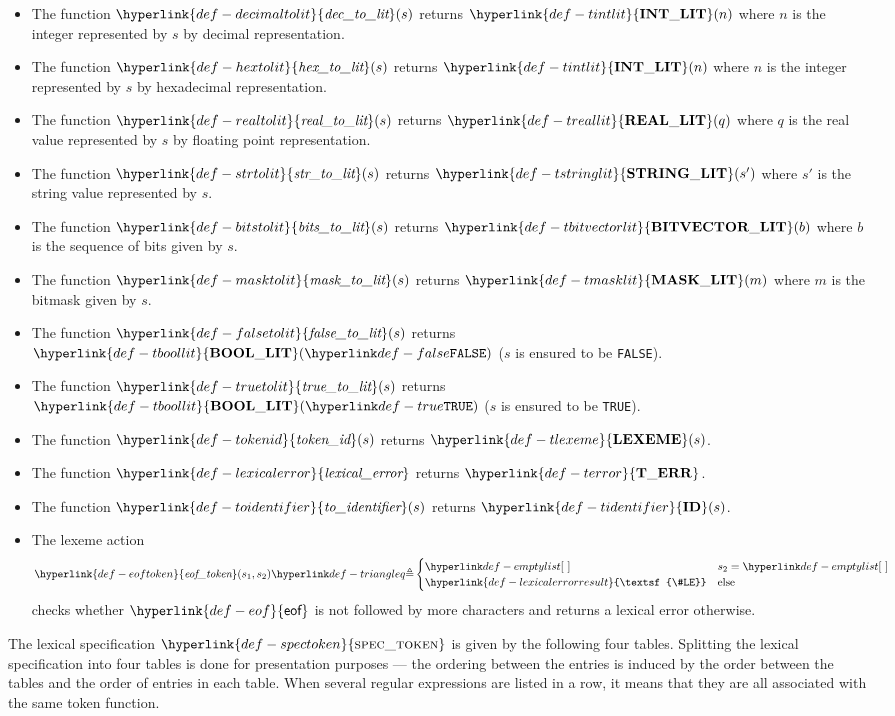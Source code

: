 \documentclass{book}
\newcommand\terminal[1]{\mathtt{\mathbf{#1}}}
\newcommand\Tidentifier[0]{\hyperlink{def-tidentifier}{\terminal{ID}}}
\newcommand\Tstringlit[0]{\hyperlink{def-tstringlit}{\terminal{STRING\_LIT}}}
\newcommand\Tmasklit[0]{\hyperlink{def-tmasklit}{\terminal{MASK\_LIT}}}
\newcommand\Tbitvectorlit[0]{\hyperlink{def-tbitvectorlit}{\terminal{BITVECTOR\_LIT}}}
\newcommand\Tintlit[0]{\hyperlink{def-tintlit}{\terminal{INT\_LIT}}}
\newcommand\Treallit[0]{\hyperlink{def-treallit}{\terminal{REAL\_LIT}}}
\newcommand\Tboollit[0]{\hyperlink{def-tboollit}{\terminal{BOOL\_LIT}}}
\newcommand\Tlexeme[0]{\hyperlink{def-tlexeme}{\terminal{LEXEME}}}
\newcommand\eof[0]{\hyperlink{def-eof}{\textsf{eof}}}
\newcommand\LexicalError[0]{\hyperlink{def-lexicalerrorresult}{\textsf{\#LE}}}
\newcommand\decimaltolit[0]{\hyperlink{def-decimaltolit}{\textfunc{dec\_to\_lit}}}
\newcommand\hextolit[0]{\hyperlink{def-hextolit}{\textfunc{hex\_to\_lit}}}
\newcommand\realtolit[0]{\hyperlink{def-realtolit}{\textfunc{real\_to\_lit}}}
\newcommand\strtolit[0]{\hyperlink{def-strtolit}{\textfunc{str\_to\_lit}}}
\newcommand\bitstolit[0]{\hyperlink{def-bitstolit}{\textfunc{bits\_to\_lit}}}
\newcommand\masktolit[0]{\hyperlink{def-masktolit}{\textfunc{mask\_to\_lit}}}
\newcommand\truetolit[0]{\hyperlink{def-truetolit}{\textfunc{true\_to\_lit}}}
\newcommand\falsetolit[0]{\hyperlink{def-falsetolit}{\textfunc{false\_to\_lit}}}
\newcommand\tokenid[0]{\hyperlink{def-tokenid}{\textfunc{token\_id}}}
\newcommand\lexicalerror[0]{\hyperlink{def-lexicalerror}{\textfunc{lexical\_error}}}
\newcommand\toidentifier[0]{\hyperlink{def-toidentifier}{\textfunc{to\_identifier}}}
\newcommand\eoftoken[0]{\hyperlink{def-eoftoken}{\textfunc{eof\_token}}}
\newcommand\Terror[0]{\hyperlink{def-terror}{\terminal{T\_ERR}}}
\newcommand\spectoken[0]{\hyperlink{def-spectoken}{\textsc{spec\_token}}}
\begin{document}
\begin{itemize}
\hypertarget{def-decimaltolit}{}
\item The function $\decimaltolit(s)$ returns $\Tintlit(n)$ where $n$ is the integer represented by $s$
by decimal representation.
\hypertarget{def-hextolit}{}
\item The function $\hextolit(s)$ returns $\Tintlit(n)$ where $n$ is the integer represented by $s$
by hexadecimal representation.
\hypertarget{def-realtolit}{}
\item The function $\realtolit(s)$ returns $\Treallit(q)$ where $q$ is the real value represented by $s$
by floating point representation.
\hypertarget{def-strtolit}{}
\item The function $\strtolit(s)$ returns $\Tstringlit(s')$ where $s'$ is the string value represented by $s$.
\hypertarget{def-bitstolit}{}
\item The function $\bitstolit(s)$ returns $\Tbitvectorlit(b)$ where $b$ is the sequence of bits
given by $s$.
\hypertarget{def-masktolit}{}
\item The function $\masktolit(s)$ returns $\Tmasklit(m)$ where $m$ is the bitmask given by $s$.
\hypertarget{def-falsetolit}{}
\item The function $\falsetolit(s)$ returns $\Tboollit(\False)$ ($s$ is ensured to be \texttt{FALSE}).
\hypertarget{def-truetolit}{}
\item The function $\truetolit(s)$ returns $\Tboollit(\True)$ ($s$ is ensured to be \texttt{TRUE}).
\hypertarget{def-tokenid}{}
\item The function $\tokenid(s)$ returns $\Tlexeme(s)$.
\hypertarget{def-lexicalerror}{}
\item The function $\lexicalerror$ returns $\Terror$.
\hypertarget{def-toidentifier}{}
\item The function $\toidentifier(s)$ returns $\Tidentifier(s)$.
\hypertarget{def-eoftoken}{}
\item The lexeme action
\[
\eoftoken(s_1, s_2) \triangleq \begin{cases}
  \emptylist & s_2 = \emptylist\\
  \LexicalError & \text{else}
\end{cases}
\]
checks whether $\eof$ is not followed by more characters and returns a lexical error otherwise.
\end{itemize}

\hypertarget{def-spectoken}{}
The lexical specification  $\spectoken$ is given by the following four tables.
Splitting the lexical specification into four tables is done for presentation purposes ---
the ordering between the entries is induced by the order between the tables
and the order of entries in each table.
%
When several regular expressions are listed in a row, it means that they are all associated with the same
token function.
\end{document}
